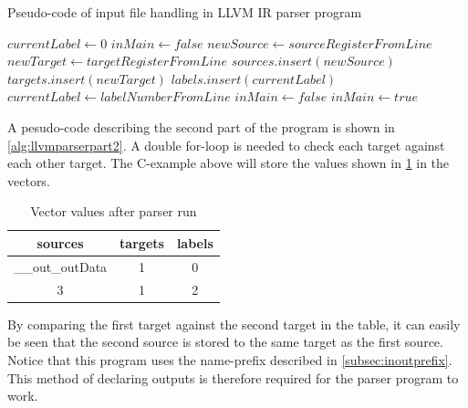 \algnewcommand{}
\algnewcommand{}
\begin{algorithm}
  \caption{Pseudo-code of input file handling in LLVM IR parser program
  \label{alg:llvmparserpart1}}
  \begin{algorithmic}[1]
    \Statex
    \State $currentLabel \leftarrow 0$
    \State $inMain \leftarrow false$
            \State $newSource \leftarrow sourceRegisterFromLine$
            \State $newTarget \leftarrow targetRegisterFromLine$
            \State $sources.insert(newSource)$
            \State $targets.insert(newTarget)$
            \State $labels.insert(currentLabel)$
            \State $currentLabel \leftarrow labelNumberFromLine$
            \State $inMain \leftarrow false$
          \EndIf
          \State $inMain \leftarrow true$
        \EndIf
      \EndWhile
    \EndIf
  \end{algorithmic}
\end{algorithm}
A pesudo-code describing the second part of the program is shown in \cref{alg:llvmparserpart2}. A double for-loop is needed to check each target against each other target. The C-example above will store the values shown in \cref{tab:llvmirparservectors} in the vectors. 
\begin{table}[hbtp]
    \centering
    \begin{tabular}{ccc}
    \textbf{sources} & \textbf{targets} & \textbf{labels} \\
    \toprule
      \_\_out\_outData & 1 & 0 \\
      3 & 1 & 2 \\
    \bottomrule
    \end{tabular}
    \caption{Vector values after parser run}
    \label{tab:llvmirparservectors}
\end{table}
By comparing the first target against the second target in the table, it can easily be seen that the second source is stored to the same target as the first source. Notice that this program uses the name-prefix described in \cref{subsec:inoutprefix}. This method of declaring outputs is therefore required for the parser program to work. 
